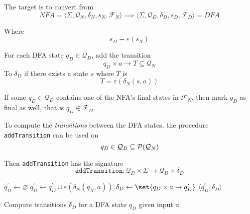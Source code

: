 \begin{definition}
    The target is to convert from
    \begin{equation}
        NFA = \langle
            \Sigma,
            \mathcal{Q}_N,
            \delta_N,
            s_N,
            \mathcal{F}_N
        \rangle \implies
        \langle
            \Sigma,
            \mathcal{Q}_D,
            \delta_D,
            s_D,
            \mathcal{F}_D
        \rangle = DFA
    \end{equation}
    
    Where
    \begin{equation}
        s_D \equiv \varepsilon(s_N)
    \end{equation}
    
    For each DFA state $q_D \in \mathcal{Q}_D$, add the transition
    \begin{equation}
        q_D \times a \to T \subseteq \mathcal{Q}_N
    \end{equation}
    To $\delta_D$ if there exists a state $s$ where $T$ is
    \begin{equation}
        T = \varepsilon(\delta_N (s, a))
    \end{equation}
    
    If some $q_D \in \mathcal{Q}_D$ contains one of the NFA's final states in $\mathcal{F}_N$, then mark $q_D$ as final as well, that is $q_D \in \mathcal{F}_D$.
\end{definition}

\begin{definition}
    To compute the \textit{transitions} between the DFA states, the procedure \texttt{addTransition} can be used on
    \begin{equation}
        q_D \in \mathcal{Q}_D \subseteq \mathcal{P}(\mathcal{Q}_N)
    \end{equation}
    
    Then \texttt{addTransition} has the signature
    \begin{equation}
        \mathtt{addTransition} \colon \mathcal{Q}_D \times \Sigma \to \mathcal{Q}_D \times \delta_D
    \end{equation}
    
    \begin{algorithm}[H]
        \begin{algorithmic}[1]
                \State $q_D^\prime \gets \varnothing$
                    \State $q_D^\prime \gets q_D^\prime \cup \varepsilon(\delta_N(q_N, a))$
                \EndFor
                \State $\delta_D \gets \set{q_D \times a \to q_D^\prime}$
                \State \Return $\langle q_D^\prime, \delta_D \rangle$
            \EndProcedure
        \end{algorithmic}
        \caption{Compute transitions $\delta_D$ for a DFA state $q_D$ given input $a$}
        \label{algo:nfa-dfa-add-transition}
    \end{algorithm}
\end{definition}

